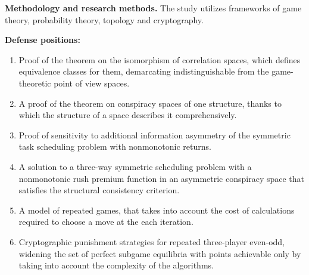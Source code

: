 \textbf{Methodology and research methods.} The study utilizes frameworks of game theory, probability theory, topology and cryptography. %

\textbf{Defense positions:}
\begin{enumerate}[beginpenalty=10000] %
  \item Proof of the theorem on the isomorphism of correlation spaces, which defines equivalence classes for them, demarcating indistinguishable from the game-theoretic point of view spaces. %
  \item A proof of the theorem on conspiracy spaces of one structure, thanks to which the structure of a space describes it comprehensively. %
  \item Proof of sensitivity to additional information asymmetry of the symmetric task scheduling problem with nonmonotonic returns. %
  \item A solution to a three-way symmetric scheduling problem with a nonmonotonic rush premium function in an asymmetric conspiracy space that satisfies the structural consistency criterion. %
  \item A model of repeated games, that takes into account the cost of calculations required to choose a move at the each iteration. %
  \item Cryptographic punishment strategies for repeated three-player even-odd, widening the set of perfect subgame equilibria with points achievable only by taking into account the complexity of the algorithms. %
\end{enumerate}

